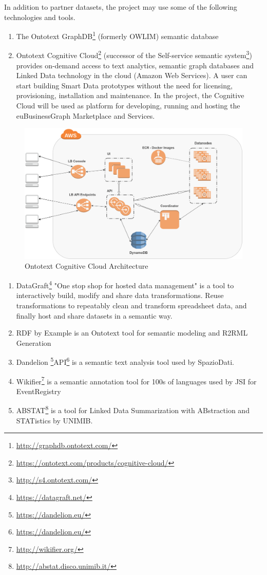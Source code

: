 \documentclass[runningheads,a4paper]{llncs}
\makeatletter
\def\maxwidth#1{\ifdim\Gin@nat@width>#1 #1\else\Gin@nat@width\fi}
\makeatother
\begin{document}
In addition to partner datasets, the project may use some of the following technologies and tools.
\begin{enumerate}
\item The Ontotext GraphDB\footnote{\url{http://graphdb.ontotext.com/}} (formerly OWLIM) semantic database  \cite{_Ref491415452}
\item Ontotext Cognitive Cloud\footnote{\url{https://ontotext.com/products/cognitive-cloud/}} (successor of the Self-service semantic system\footnote{\url{http://s4.ontotext.com/}}) provides on-demand access to text analytics, semantic graph databases and Linked Data technology in the cloud (Amazon Web Services). A user can start building Smart Data prototypes without the need for licensing, provisioning, installation and maintenance. In the project, the Cognitive Cloud will be used as platform for developing, running and hosting the euBusinessGraph Marketplace and Services. 
\end{enumerate}
\begin{figure}[h!]
\centering
\includegraphics[width=\maxwidth{\textwidth}]{img/100002010000040A0000026EC21D7062070F7BE7.png}
\cprotect\caption{Ontotext Cognitive Cloud Architecture}
\label{}
\end{figure}

\begin{enumerate}
\item DataGraft\footnote{\url{https://datagraft.net/}} \cite{__RefNumPara__7260_1562275339} \cite{_Ref491437414} "One stop shop for hosted data management" is a tool to interactively build, modify and share data transformations. Reuse transformations to repeatably clean and transform spreadsheet data, and finally host and share datasets in a semantic way. 
\item RDF by Example  \cite{_Ref491195157} is an Ontotext tool for semantic modeling and R2RML Generation
\item Dandelion \footnote{\url{https://dandelion.eu/}}API\footnote{\url{https://dandelion.eu/}} is a semantic text analysis tool used by SpazioDati.
\item Wikifier\footnote{\url{http://wikifier.org/}} is a semantic annotation tool for 100s of languages used by JSI for EventRegistry
\item ABSTAT\footnote{\url{http://abstat.disco.unimib.it/}} is a tool for Linked Data Summarization with ABstraction and STATistics by UNIMIB.
\end{enumerate}
\end{document}
